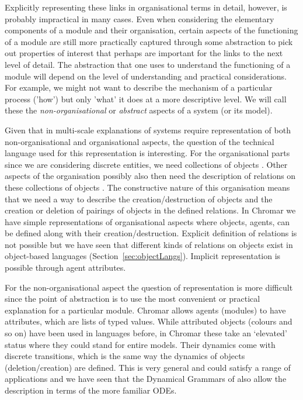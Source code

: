 \documentclass[phd]{infthesis}
\begin{document}
Explicitly representing these links in organisational terms in detail, however,
is probably impractical in many cases. Even when considering the elementary
components of a module and their organisation, certain aspects of the
functioning of a module are still more practically captured through some
abstraction to pick out properties of interest that perhaps are important for
the links to the next level of detail. The abstraction that one uses to
understand the functioning of a module will depend on the level of understanding
and practical considerations. For example, we might not want to describe the
mechanism of a particular process ('how') but only 'what' it does at a more
descriptive level.  We will call these the \emph{non-organisational} or
\emph{abstract} aspects of a system (or its model).

Given that in multi-scale explanations of systems require representation of both
non-organisational and organisational aspects, the question of the technical
language used for this representation is interesting. For the organisational
parts since we are considering discrete entities, we need collections of objects
\citep{fontana_barrier_1996}. Other aspects of the organisation possibly also
then need the description of relations on these collections of objects
\citep{rashevsky_topology_1954, rosen_relational_1958}. The constructive nature
of this organisation means that we need a way to describe the
creation/destruction of objects and the creation or deletion of pairings of
objects in the defined relations. In Chromar we have simple representations of
organisational aspects where objects, agents, can be defined along with their
creation/destruction. Explicit definition of relations is not possible but we
have seen that different kinds of relations on objects exist in object-based
languages (Section~\ref{sec:objectLangs}). Implicit representation is possible
through agent attributes.

For the non-organisational aspect the question of representation is more
difficult since the point of abstraction is to use the most convenient or
practical explanation for a particular module. Chromar allows agents (modules)
to have attributes, which are lists of typed values. While attributed objects
(colours and so on) have been used in languages before, in Chromar these take an
`elevated' status where they could stand for entire models. Their dynamics come with
discrete transitions, which is the same way the dynamics of objects
(deletion/creation) are defined. This is very general and could satisfy a range
of applications and we have seen that the Dynamical Grammars of
\citet{mjolsness2006stochastic} also allow the description in terms of the more
familiar ODEs. 
\end{document}
